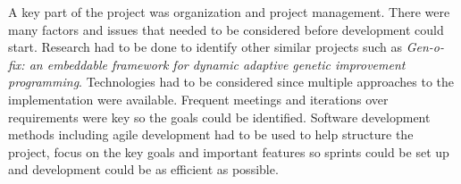 A key part of the project was organization and project management. There were many
factors and issues that needed to be considered before development could start. Research had to be done to identify
other similar projects such as \textit{Gen-o-fix: an embeddable framework for dynamic adaptive genetic improvement programming}\cite{genofix}.
Technologies had to be considered since multiple approaches to the implementation were available. Frequent meetings and 
iterations over requirements were key so the goals could be identified. Software development methods including agile development had to be used to help structure the
project, focus on the key goals and important features so sprints could be set up and development could be as efficient as possible.



